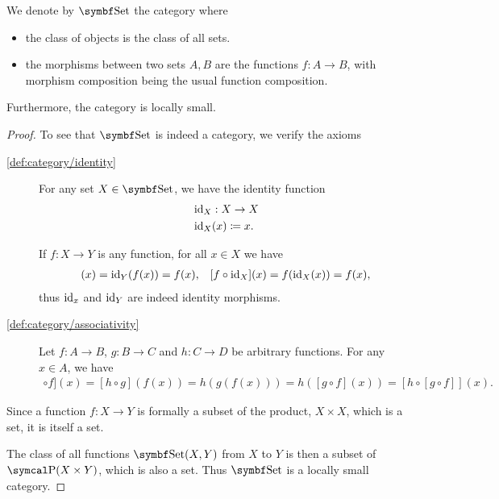 \begin{definition}\label{def:category_of_sets}
  We denote by \( \Cat{Set} \) the category where
  \begin{itemize}
    \item the class of objects is the class of all sets.
    \item the morphisms between two sets \( A, B \) are the functions \( f: A \to B \), with morphism composition being the usual function composition.
  \end{itemize}

  Furthermore, the category is locally small.
\end{definition}
\begin{proof}
  To see that \( \Cat{Set} \) is indeed a category, we verify the axioms
  \begin{description}
    \item [\ref{def:category/identity}] For any set \( X \in \Cat{Set} \), we have the identity function
    \begin{align*}
      &\operatorname{id}_X: X \to X \\
      &\operatorname{id}_X(x) \coloneqq x.
    \end{align*}

    If \( f: X \to Y \) is any function, for all \( x \in X \) we have
    \begin{align*}
      [\Id_Y \circ f](x) = \Id_Y(f(x)) = f(x),
      &&
      [f \circ \Id_X](x) = f(\Id_X(x)) = f(x),
    \end{align*}
    thus \( \operatorname{id}_x \) and \( \operatorname{id}_Y \) are indeed identity morphisms.

    \item [\ref{def:category/associativity}] Let \( f: A \to B \), \( g: B \to C \) and \( h: C \to D \) be arbitrary functions. For any \( x \in A \), we have
    \begin{align*}
      [[h \circ g] \circ f](x)
      =
      [h \circ g](f(x))
      =
      h(g(f(x)))
      =
      h([g \circ f](x))
      =
      [h \circ [g \circ f]](x).
    \end{align*}
  \end{description}

  Since a function \( f: X \to Y \) is formally a subset of the product, \( X \times X \), which is a set, it is itself a set.

  The class of all functions \( \Cat{Set}(X, Y) \) from \( X \) to \( Y \) is then a subset of \( \Power(X \times Y) \), which is also a set. Thus \( \Bold{Set} \) is a locally small category.
\end{proof}

